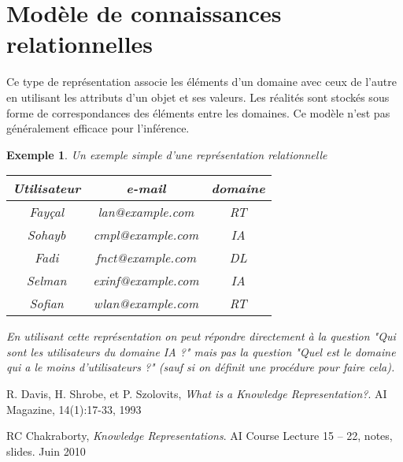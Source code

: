 \documentclass[12pt,a4paper]{report}
\newtheorem{example}{Exemple}
\begin{document}
\section{Modèle de connaissances relationnelles}
Ce type de représentation associe les éléments d'un domaine avec ceux de l'autre en utilisant les attributs d'un objet et
ses valeurs. Les réalités sont stockés sous forme de correspondances des éléments entre les domaines. Ce modèle n'est pas
généralement efficace pour l'inférence.\cite{KRC}
\begin{example}
Un exemple simple d'une représentation relationnelle

\begin{table}[h]
\centering
\begin{tabular}{|c|c|c|}
\hline
Utilisateur & e-mail & domaine \\
\hline
Fayçal & lan@example.com & RT \\
\hline
Sohayb & cmpl@example.com & IA \\
\hline
Fadi & fnct@example.com & DL \\
\hline
Selman & exinf@example.com & IA \\
\hline
Sofian & wlan@example.com & RT \\
\hline
\end{tabular}
\end{table}
En utilisant cette représentation on peut répondre directement à la question "Qui sont les utilisateurs du domaine IA ?"
mais pas la question "Quel est le domaine qui a le moins d'utilisateurs ?" (sauf si on définit une procédure
pour faire cela).
\end{example}


\begin{thebibliography}{9}
R. Davis, H. Shrobe, et P. Szolovits,
\emph{What is a Knowledge Representation?}.
AI Magazine, 14(1):17-33, 1993

RC Chakraborty,
\emph{Knowledge Representations}.
AI Course Lecture 15 – 22, notes, slides. Juin 2010 
\end{thebibliography}
\end{document}

